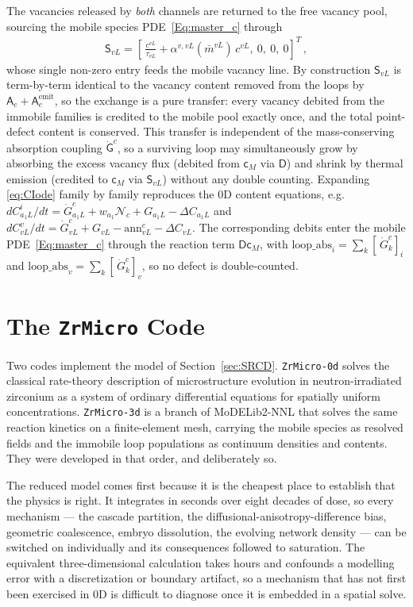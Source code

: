 \documentclass{article}
\newcommand{\spvec}[1]{\bm{\mathsf{#1}}}   %
\newcommand{\spmat}[1]{\bm{\mathsf{#1}}}   %
\newcommand{\ZrM}{\texttt{ZrMicro-3d}}
\newcommand{\MoD}{\textsf{MoDELib2-NNL}}
\newcommand{\ZrOd}{\texttt{ZrMicro-0d}}
\begin{document}
The vacancies released by \emph{both} channels are returned to the free vacancy pool, sourcing the mobile species PDE~\eqref{Eq:master_c} through
\begin{align}\label{eq:Semit}
\spvec{S}_{vL}=\left[\,\frac{c^{vL}}{\tau_{vL}}+\alpha^{v,vL}(\bar m^{vL})\,c^{vL},\ 0,\ 0,\ 0\right]^T\, ,
\end{align}
whose single non-zero entry feeds the mobile vacancy line. By construction $\spvec{S}_{vL}$ is term-by-term identical to the vacancy content removed from the loops by $\spvec{A}_c+\spvec{A}_c^{\mathrm{emit}}$, so the exchange is a pure transfer: every vacancy debited from the immobile families is credited to the mobile pool exactly once, and the total point-defect content is conserved. This transfer is independent of the mass-conserving absorption coupling $\dot{\spvec{G}}^{c}$, so a surviving loop may simultaneously grow by absorbing the excess vacancy flux (debited from $\spvec{c}_M$ via $\spmat{D}$) and shrink by thermal emission (credited to $\spvec{c}_M$ via $\spvec{S}_{vL}$) without any double counting.
Expanding \eqref{eq:CIode} family by family reproduces the $0$D content equations, e.g. $dC_{a_1L}^{i}/dt=\dot G^{c}_{a_1L}+w_{a_1}\mathcal{N}_c+G_{a_1L}-\Delta C_{a_1L}$ and $dC_{vL}^{v}/dt=\dot G^{c}_{vL}+G_{vL}-\mathrm{ann}^{c}_{vL}-\Delta C_{vL}$. The corresponding debits enter the mobile PDE~\eqref{Eq:master_c} through the reaction term $\spmat{D}\spvec{c}_M$, with $\text{loop\_abs}_i=\sum_k[\,\dot G^{c}_k]_i$ and $\text{loop\_abs}_v=\sum_k[\,\dot G^{c}_k]_v$, so no defect is double-counted.

\section{The \texttt{ZrMicro} Code}
\label{sec:zr3d_ghoniem}
\label{sec:intro}
\label{sec:structure}

Two codes implement the model of Section~\ref{sec:SRCD}. {\ZrOd} solves the
classical rate-theory description of microstructure evolution in
neutron-irradiated zirconium as a system of ordinary differential equations for
spatially uniform concentrations. {\ZrM} is a branch of {\MoD} that solves the
same reaction kinetics on a finite-element mesh, carrying the mobile species as
resolved fields and the immobile loop populations as continuum densities and
contents. They were developed in that order, and deliberately so.

The reduced model comes first because it is the cheapest place to establish that
the physics is right. It integrates in seconds over eight decades of dose, so
every mechanism --- the cascade partition, the diffusional-anisotropy-difference
bias, geometric coalescence, embryo dissolution, the evolving network density ---
can be switched on individually and its consequences followed to saturation. The
equivalent three-dimensional calculation takes hours and confounds a modelling
error with a discretization or boundary artifact, so a mechanism that has not
first been exercised in $0$D is difficult to diagnose once it is embedded in a
spatial solve.
\end{document}
